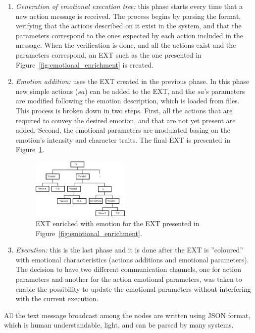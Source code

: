 \begin{enumerate}
	\item \textit{Generation of emotional execution tree:} this phase starts every time that a new action message is received. The process begins by parsing the format, verifying that the actions described on it exist in the system, and that the parameters correspond to the ones expected by each action included in the message. 
When the verification is done, and all the actions exist and the parameters correspond, an EXT such as the one presented in Figure~\ref{fig:emotional_enrichment} is created.
	\item \textit{Emotion addition:} uses the EXT created in the previous phase. In this phase new simple actions ($sa$)
can be added to the EXT, and the $sa$'s parameters are modified following the emotion description, which is loaded from files. This process is broken down in two steps. First, all the actions that are required to convey the desired emotion, and that are not yet present are added. Second, the emotional parameters are modulated basing on the emotion's intensity and character traits. The final EXT is presented in Figure~\ref{fig:reference}.
	\begin{figure}
		\centering
	\includegraphics[width=0.45\textwidth]{./Images/exampleTreeE.png}
	\caption{EXT enriched with emotion for the EXT presented in Figure~\ref{fig:emotional_enrichment}.} 
	\label{fig:reference}
	\end{figure}
	\item \textit{Execution:} this is the last phase and it is done after the EXT is ''coloured'' with emotional characteristics (actions additions and emotional parameters). The decision to have two different communication channels, one for action parameters and another for the action emotional parameters, was taken to enable the possibility to update the emotional parameters without interfering with the current execution. 
\end{enumerate}

All the text message broadcast among the nodes are written using JSON format, which is human understandable, light, and can be parsed by many systems.
 
